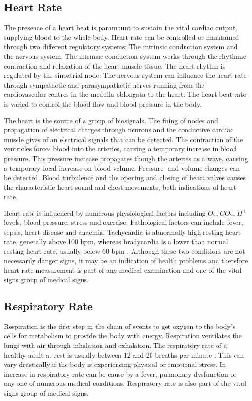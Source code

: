 \subsection{Heart Rate}
The presence of a heart beat is paramount to sustain the vital cardiac output, supplying blood to the whole body. Heart rate can be controlled or maintained through two different regulatory systems: The intrinsic conduction system and the nervous system. The intrinsic conduction system works through the rhythmic contraction and relaxation of the heart muscle tissue. The heart rhythm is regulated by the sinoatrial node. The nervous system can influence the heart rate through sympathetic and parasympathetic nerves running from the cardiovascular centres in the medulla oblongata to the heart. The heart beat rate is varied to control the blood flow and blood pressure in the body.

\medskip

The heart is the source of a group of biosignals. The firing of nodes and propagation of electrical charges through neurons and the conductive cardiac muscle gives of an electrical signals that can be detected. The contraction of the  ventricles forces blood into the arteries, causing a temporary increase in blood pressure. This pressure increase propagates though the arteries as a wave, causing a temporary local increase on blood volume. Pressure- and volume changes can be detected. Blood turbulence and the opening and closing of heart valves causes the characteristic heart sound and chest movements, both indications of heart rate.

\medskip

Heart rate is influenced by numerous physiological factors including $O_2$, $CO_2$, $H^+$ levels, blood pressure, stress and exercise. Pathological factors can include fever, sepsis, heart disease and anaemia. Tachycardia is abnormally high resting heart rate, generally above 100 bpm, whereas bradycardia is a lower than normal resting heart rate, usually below 60 bpm \citep{normalRestingHR}. Although these two conditions are not necessarily danger signs, it may be an indication of health problems and therefore heart rate measurement is part of any medical examination and one of the vital signs group of medical signs.

\subsection{Respiratory Rate}
Respiration is the first step in the chain of events to get oxygen to the body's cells for metabolism to provide the body with energy. Respiration ventilates the lungs with air through inhalation and exhalation. The respiratory rate of a healthy adult at rest is usually between 12 and 20 breaths per minute \citep{medscapeBreathingRate}. This can vary drastically if the body is experiencing physical or emotional stress. In increase in respiratory rate can be cause by a fever, pulmonary dysfunction or any one of numerous medical conditions. Respiratory rate is also part of the vital signs group of medical signs.

